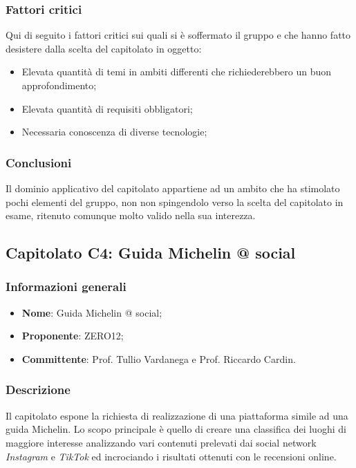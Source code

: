 \documentclass[11pt]{article}
\begin{document}
    \subsubsection{Fattori critici}
    Qui di seguito i fattori critici sui quali si è soffermato il gruppo e che hanno fatto desistere dalla scelta del capitolato in
    oggetto:
    \begin{itemize}
    	\item Elevata quantità di temi in ambiti differenti che richiederebbero un buon approfondimento;
    	\item Elevata quantità di requisiti obbligatori;
    	\item Necessaria conoscenza di diverse tecnologie;
    \end{itemize}
    
    \subsubsection{Conclusioni}
    Il dominio applicativo del capitolato appartiene ad un ambito che ha stimolato pochi elementi del gruppo, non non spingendolo
    verso la scelta del capitolato in esame, ritenuto comunque molto valido nella sua interezza.
    
\newpage


\subsection{Capitolato C4: Guida Michelin @ social}

    \subsubsection{Informazioni generali}
    \begin{itemize}
        \item \textbf{Nome}: Guida Michelin @ social;
        \item \textbf{Proponente}: ZERO12;
        \item \textbf{Committente}: Prof. Tullio Vardanega e Prof. Riccardo Cardin.
    \end{itemize}
    
    \subsubsection{Descrizione}
    Il capitolato espone la richiesta di realizzazione di una piattaforma simile ad una guida Michelin. Lo scopo principale è quello
    di creare una classifica dei luoghi di maggiore interesse analizzando vari contenuti prelevati dai social network \textit{Instagram}
    e \textit{TikTok} ed incrociando i risultati ottenuti con le recensioni online.
    
\end{document}
